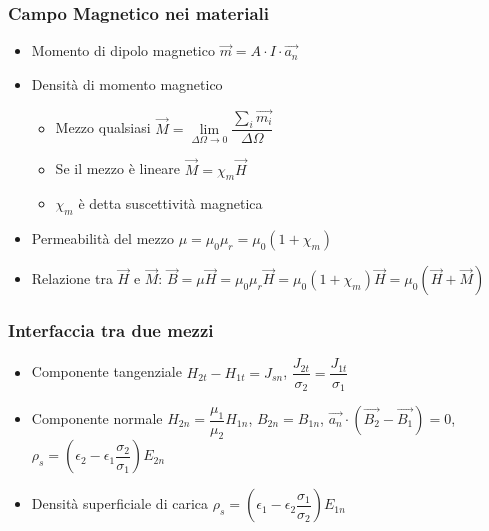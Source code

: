 \documentclass{article}
\begin{document}
\subsubsection{Campo Magnetico nei materiali}
\begin{itemize}
	\item Momento di dipolo magnetico \( \vec{m} = A \cdot I \cdot \vec{a_n} \)
	\item Densità di momento magnetico
	\begin{itemize}
		\item Mezzo qualsiasi \(\vec{M} = \lim\limits_{\Delta\Omega \rightarrow 0} \dfrac{\sum_i \vec{m_i}}{\Delta\Omega}\)
		\item Se il mezzo è lineare \( \vec{M} = \chi_m \vec{H} \)
		\item \(\chi_m\) è detta suscettività magnetica
	\end{itemize}
	\item Permeabilità del mezzo \( \mu = \mu_0 \mu_r = \mu_0 (1 + \chi_m) \)
	\item Relazione tra \( \vec{H} \) e \( \vec{M} \): \( \vec{B} = \mu \vec{H} = \mu_0 \mu_r \vec{H} = \mu_0 (1 + \chi_m) \vec{H} = \mu_0 (\vec{H} + \vec{M}) \)
\end{itemize}



\subsubsection{Interfaccia tra due mezzi}
\begin{itemize}
	\item Componente tangenziale \( H_{2t} - H_{1t} = J_{sn} \), \( \dfrac{J_{2t}}{\sigma_2} = \dfrac{J_{1t}}{\sigma_1} \)
	\item Componente normale \( H_{2n} = \dfrac{\mu_1}{\mu_2} H_{1n} \), \(B_{2n} = B_{1n}\), \( \vec{a_n} \cdot \left(\vec{B_2} - \vec{B_1} \right) = 0 \), \( \rho_s = \left( \epsilon_2 - \epsilon_1 \dfrac{\sigma_2}{\sigma_1} \right) E_{2n} \)
	\item Densità superficiale di carica \( \rho_s = \left( \epsilon_1 - \epsilon_2 \dfrac{\sigma_1}{\sigma_2} \right) E_{1n} \)
\end{itemize}
\end{document}
